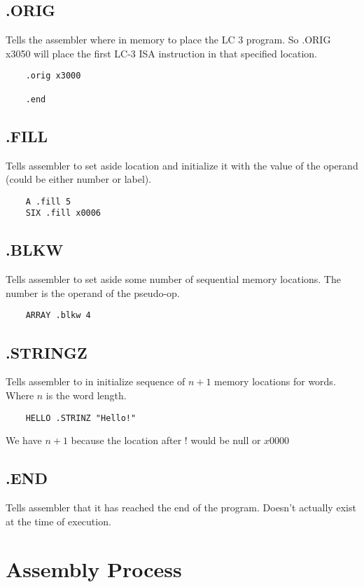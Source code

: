 \subsection{.ORIG}
Tells the assembler where in memory to place the LC 3 program. So .ORIG  x3050 will place the first LC-3 ISA instruction in that specified location.

\begin{verbatim}
    .orig x3000

    .end
\end{verbatim}

\subsection{.FILL}
Tells assembler to set aside location and initialize it with the value of the operand (could be either number or label). 
\begin{verbatim}
    A .fill 5
    SIX .fill x0006
\end{verbatim}

\subsection{.BLKW}
Tells assembler to set aside some number of sequential memory locations. The number is the operand of the pseudo-op.
\begin{verbatim}
    ARRAY .blkw 4
\end{verbatim}

\subsection{.STRINGZ}
Tells assembler to in initialize sequence of $n + 1$ memory locations for words. Where $n$ is the word length. 

\begin{verbatim}
    HELLO .STRINZ "Hello!"
\end{verbatim}

We have $n + 1$ because the location after $!$ would be null or $x0000$

\subsection{.END}
Tells assembler that it has reached the end of the program. Doesn't actually exist at the time of execution.


\section{Assembly Process}
